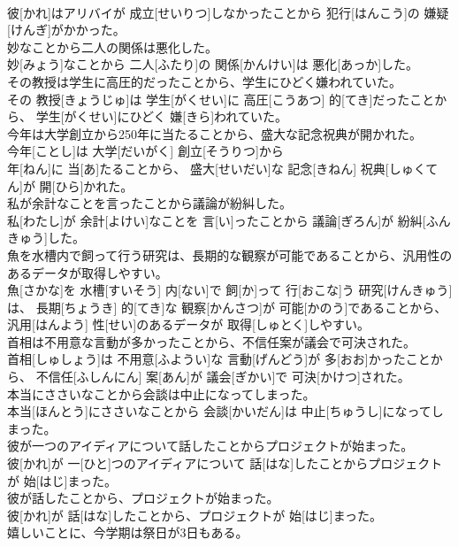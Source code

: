 \documentclass[8pt]{extreport}
\begin{document}
\begin{CJK}{UTF8}{min}
\\	彼[かれ]はアリバイが 成立[せいりつ]しなかったことから 犯行[はんこう]の 嫌疑[けんぎ]がかかった。
\\	妙なことから二人の関係は悪化した。	
\\	妙[みょう]なことから 二人[ふたり]の 関係[かんけい]は 悪化[あっか]した。
\\	その教授は学生に高圧的だったことから、学生にひどく嫌われていた。	
\\	その 教授[きょうじゅ]は 学生[がくせい]に 高圧[こうあつ] 的[てき]だったことから、 学生[がくせい]にひどく 嫌[きら]われていた。
\\	今年は大学創立から250年に当たることから、盛大な記念祝典が開かれた。	
\\	今年[ことし]は 大学[だいがく] 創立[そうりつ]から 
\\	年[ねん]に 当[あ]たることから、 盛大[せいだい]な 記念[きねん] 祝典[しゅくてん]が 開[ひら]かれた。
\\	私が余計なことを言ったことから議論が紛糾した。	
\\	私[わたし]が 余計[よけい]なことを 言[い]ったことから 議論[ぎろん]が 紛糾[ふんきゅう]した。
\\	魚を水槽内で飼って行う研究は、長期的な観察が可能であることから、汎用性のあるデータが取得しやすい。	
\\	魚[さかな]を 水槽[すいそう] 内[ない]で 飼[か]って 行[おこな]う 研究[けんきゅう]は、 長期[ちょうき] 的[てき]な 観察[かんさつ]が 可能[かのう]であることから、 汎用[はんよう] 性[せい]のあるデータが 取得[しゅとく]しやすい。
\\	首相は不用意な言動が多かったことから、不信任案が議会で可決された。	
\\	首相[しゅしょう]は 不用意[ふようい]な 言動[げんどう]が 多[おお]かったことから、 不信任[ふしんにん] 案[あん]が 議会[ぎかい]で 可決[かけつ]された。
\\	本当にささいなことから会談は中止になってしまった。	
\\	本当[ほんとう]にささいなことから 会談[かいだん]は 中止[ちゅうし]になってしまった。
\\	彼が一つのアイディアについて話したことからプロジェクトが始まった。	
\\	彼[かれ]が 一[ひと]つのアイディアについて 話[はな]したことからプロジェクトが 始[はじ]まった。
\\	彼が話したことから、プロジェクトが始まった。	
\\	彼[かれ]が 話[はな]したことから、プロジェクトが 始[はじ]まった。
\\	嬉しいことに、今学期は祭日が3日もある。	

\end{CJK}
\end{document}
